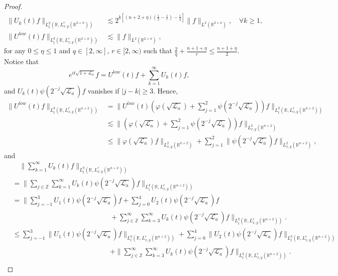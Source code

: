\documentclass[a4paper,11pt, reqno]{amsart}
\numberwithin{equation}{section}
\theoremstyle{plain}
\theoremstyle{definition}
\theoremstyle{remark}
\begin{document}
\begin{proof}
\begin{align*}
\|U_k(t)f\|_{L_t^q(\mathbb{R},L^r_{x,y}(\mathbb{R}^{2+n}))}&\lesssim 2^{k[(n+2+\eta)(\frac{1}{2}-\frac{1}{r})-\frac{1}{q}]}\|f\|_{L^2(\mathbb{R}^{2+n})}, \quad\forall k\geq1,\\
\|U^{low}(t)f\|_{L_t^q(\mathbb{R},L^r_{x,y}(\mathbb{R}^{2+n}))}&\lesssim \|f\|_{L^2(\mathbb{R}^{2+n})},
\end{align*}
for any $0\leq \eta\leq1$ and $q\in[2,\infty]$, $r\in [2,\infty)$ such that $\frac{2}{q}+\frac{n+1+\eta}{r}\leq \frac{n+1+\eta}{2}$. Notice that
\begin{equation*}
e^{it\sqrt{1+\mathcal{L}_a}}f=U^{low}(t)f+\sum_{k=1}^\infty U_k(t)f,
\end{equation*}
and $U_k(t)\psi(2^{-j}\sqrt{\mathcal{L}_a})f$ vanishes if $|j-k|\geq3$. Hence, 
\begin{align*}
\|U^{low}(t)f\|_{L_t^q(\mathbb{R},L^r_{x,y}(\mathbb{R}^{n+2}))}&=\|U^{low}(t)(\varphi(\sqrt{\mathcal{L}_a})+\sum_{j=1}^2\psi(2^{-j}\sqrt{\mathcal{L}_a}))f\|_{L_t^q(\mathbb{R},L^r_{x,y}(\mathbb{R}^{n+2}))}\\
&\lesssim \|(\varphi(\sqrt{\mathcal{L}_a})+\sum_{j=1}^2\psi(2^{-j}\sqrt{\mathcal{L}_a}))f\|_{L^2_{x,y}(\mathbb{R}^{n+2})}\\
&\leq \|\varphi(\sqrt{\mathcal{L}_a})f\|_{L^2_{x,y}(\mathbb{R}^{n+2})}+\sum_{j=1}^2\|\psi(2^{-j}\sqrt{\mathcal{L}_a})f\|_{L^2_{x,y}(\mathbb{R}^{n+2})},
\end{align*}
and
\begin{align*}
&\quad \|\sum_{k=1}^\infty U_k(t)f\|_{L_t^q(\mathbb{R},L^r_{x,y}(\mathbb{R}^{n+2}))}\\
&=\|\sum_{j\in\mathbb{Z}}\sum_{k=1}^\infty U_k(t)\psi(2^{-j}\sqrt{\mathcal{L}_a})f\|_{L_t^q(\mathbb{R},L^r_{x,y}(\mathbb{R}^{n+2}))}\\
&=\Big\|\sum_{j=-1}^3U_1(t)\psi(2^{-j}\sqrt{\mathcal{L}_a})f+\sum_{j=0}^4U_2(t)\psi(2^{-j}\sqrt{\mathcal{L}_a})f\\
&\qquad\qquad\qquad\qquad\qquad\qquad\qquad+\sum_{j\in\mathbb{Z}}^\infty\sum_{k=3}^\infty U_k(t)\psi(2^{-j}\sqrt{\mathcal{L}_a})f\Big\|_{L_t^q(\mathbb{R},L^r_{x,y}(\mathbb{R}^{n+2}))}.\\
&\leq \sum_{j=-1}^3\|U_1(t)\psi(2^{-j}\sqrt{\mathcal{L}_a})f\|_{L_t^q(\mathbb{R},L^r_{x,y}(\mathbb{R}^{n+2}))}+\sum_{j=0}^4\|U_2(t)\psi(2^{-j}\sqrt{\mathcal{L}_a})f\|_{L_t^q(\mathbb{R},L^r_{x,y}(\mathbb{R}^{n+2}))}\\
&\qquad\qquad\qquad\qquad\qquad\qquad\qquad+\|\sum_{j\in\mathbb{Z}}^\infty\sum_{k=3}^\infty U_k(t)\psi(2^{-j}\sqrt{\mathcal{L}_a})f\|_{L_t^q(\mathbb{R},L^r_{x,y}(\mathbb{R}^{n+2}))}.\\

\end{align*}
\end{proof}
\end{document}
